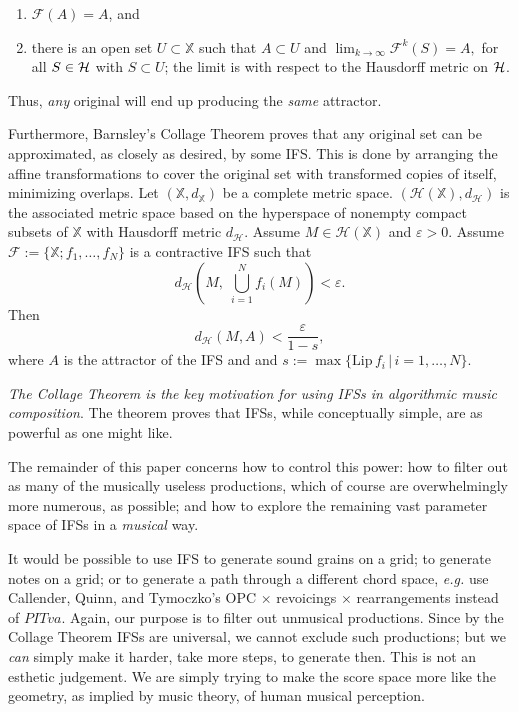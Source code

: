 \documentclass[english,11pt,letterpaper,onecolumn]{scrartcl}
\numberwithin{equation}{section}
\newcommand{\st}{\,|\,}
\newcommand{\X}{\mathbb{X}}
\newcommand{\cF}{\mathcal{F}}
\newcommand{\calH}{\mathcal{H}}
\begin{document}
\begin{enumerate}
\item $\cF(A)=A$, and

\item there is an open set $U\subset \X$ such that $A\subset U$ and
$\lim_{k\rightarrow\infty}\mathcal{F}^{k}(S)=A,$ for all $S\in \cal{H}$ with 
$S\subset U$; the limit is with respect to the Hausdorff metric on $\cal{H}$.
\end{enumerate}

\noindent Thus, \textit{any} original will end up producing the 
\textit{same} attractor. 

Furthermore, Barnsley's Collage Theorem \cite{barnsley:1986:solution} proves 
that any original set can be approximated, as closely as desired, by some IFS. 
This is done by arranging the affine transformations to cover the original set 
with transformed copies of itself, minimizing overlaps. Let 
$(\mathbb{X},d_\mathbb{X})$ be a complete metric space. $(\calH (\X), d_\calH)$ 
is the associated metric space based on the hyperspace of nonempty compact 
subsets of $\X$ with Hausdorff metric $d_\calH$. Assume $M\in\calH(\X)$ and 
$\varepsilon > 0$. Assume $\cF := \{\X; f_1, \ldots, f_N\}$ is a contractive 
IFS such that
\[
d_\calH \left(M, \;\bigcup_{i=1}^N f_i (M) \right) < \varepsilon.
\]
Then
\[
d_\calH (M, A) < \frac{\varepsilon}{1-s},
\]
where $A$ is the attractor of the IFS and  and $s := \max\{\mathrm{Lip}\,f_i\st 
i = 1, \ldots, N\}$.

\textit{The Collage Theorem is the key motivation for using IFSs in 
algorithmic music composition}. The theorem proves that IFSs, while 
conceptually simple, are as powerful as one might like. 

The remainder of this paper concerns how to control this power: how to 
filter out as many of the musically useless productions, which of course are 
overwhelmingly more numerous, as possible; and how to explore the 
remaining vast parameter space of IFSs in a \textit{musical} way.

It would be possible to use IFS to generate sound grains on a grid; to 
generate notes on a grid; or to generate a path through a different chord 
space, \textit{e.g.} use Callender, Quinn, and Tymoczko's OPC $\times$ 
revoicings $\times$ rearrangements instead of $PITva$. Again, our purpose is 
to filter out unmusical productions. Since by the Collage Theorem IFSs are 
universal, we cannot exclude such productions; but we \textit{can} simply make 
it harder, take more steps, to generate then. This is not an esthetic 
judgement. We are simply trying to make the score space more like the 
geometry, as implied by music theory, of human musical perception.
\end{document}

